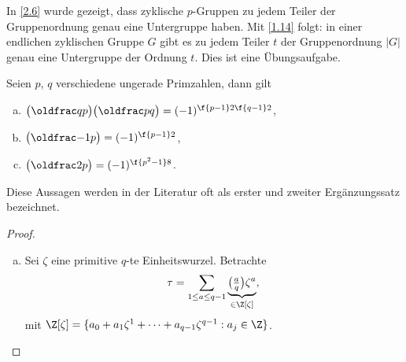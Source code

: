 \begin{nt*}
	In \ref{2.6} wurde gezeigt, dass zyklische $p$-Gruppen zu jedem Teiler der Gruppenordnung genau eine Untergruppe haben.
	Mit \ref{1.14} folgt: in einer endlichen zyklischen Gruppe $G$ gibt es zu jedem Teiler $t$ der Gruppenordnung $|G|$ genau eine Untergruppe der Ordnung $t$.
	Dies ist eine Übungsaufgabe. \Exercise
\end{nt*}

\begin{st} \label{2.15}
	Seien $p$, $q$ verschiedene ungerade Primzahlen, dann gilt
	\begin{enumerate}[a)]
		\item
			$\legsym qp \legsym pq = (-1)^{\f {p-1}2 \f{q-1}2}$,
		\item
			$\legsym {-1}p = (-1)^{\f {p-1}2}$,
		\item
			$\legsym 2p = (-1)^{\f{p^2 -1}8}$.
	\end{enumerate}
	Diese Aussagen werden in der Literatur oft als erster und zweiter Ergänzungssatz bezeichnet.
	\begin{proof}
		\begin{enumerate}[a)]
			\item
				Sei $\zeta$ eine primitive $q$-te Einheitswurzel.
				Betrachte
				\[
					\tau = \sum_{1 \le a \le q-1} \underbrace{\legsym aq \zeta^a}_{\in \Z[\zeta]},
				\]
				mit $\Z[\zeta] = \{ a_0 + a_1 \zeta^1 + \dotsb + a_{q-1} \zeta^{q-1} : a_j \in \Z\}$.


\end{enumerate}
\end{proof}
\end{st}
